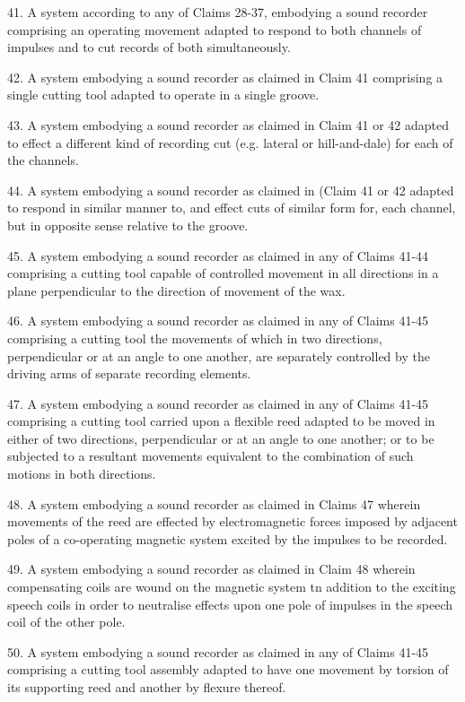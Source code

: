 \documentclass[11pt]{article}
\begin{document}
\begin{multicols*}{2}
41. A system according to any of Claims 28-37, embodying a sound recorder comprising an operating movement adapted to respond to both channels of impulses and to cut records of both simultaneously.

42. A system embodying a sound recorder as claimed in Claim 41 comprising a single cutting tool adapted to operate in a single groove.

43. A system embodying a sound recorder as claimed in Claim 41 or 42 adapted to effect a different kind of recording cut (e.g. lateral or hill-and-dale) for each of the channels. 

44. A system embodying a sound recorder as claimed in (Claim 41 or 42 adapted to respond in similar manner to, and effect cuts of similar form for, each channel, but in opposite sense relative to the groove. 

45. A system embodying a sound recorder as claimed in any of Claims 41-44 comprising a cutting tool capable of controlled movement in all directions in a plane perpendicular to the direction of movement of the wax. 

46. A system embodying a sound recorder as claimed in any of Claims 41-45 comprising a cutting tool the movements of which in two directions, perpendicular or at an angle to one another, are separately controlled by the driving arms of separate recording elements.

47. A system embodying a sound recorder as claimed in any of Claims 41-45 comprising a cutting tool carried upon a flexible reed adapted to be moved in either of two directions, perpendicular or at an angle to one another; or to be subjected to a resultant movements equivalent to the combination of such motions in both directions.

48.  A system embodying a sound recorder as claimed in Claims 47 wherein movements of the reed are effected by electromagnetic forces imposed by adjacent poles of a co-operating magnetic system excited by the impulses to be recorded.

49. A system embodying a sound recorder as claimed in Claim 48 wherein compensating coils are wound on the magnetic system tn addition to the exciting speech coils in order to neutralise effects upon one pole of impulses in the speech coil of the other pole.

50. A system embodying a sound recorder as claimed in any of Claims 41-45 comprising a cutting tool assembly adapted to have one movement by torsion of its supporting reed and another by flexure thereof.


\end{multicols*}
\end{document}
